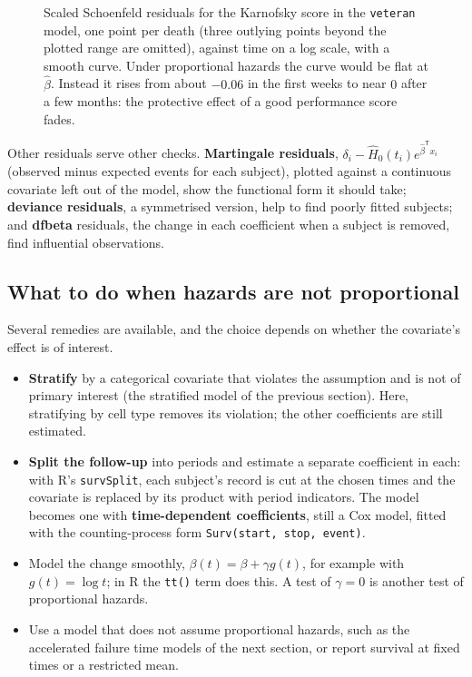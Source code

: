\documentclass[11pt,a4paper]{article}
\numberwithin{equation}{section}
\theoremstyle{definition}
\begin{document}
\begin{figure}[H]
\caption{Scaled Schoenfeld residuals for the Karnofsky score in the \texttt{veteran} model, one point per death (three outlying points beyond the plotted range are omitted), against time on a log scale, with a smooth curve. Under proportional hazards the curve would be flat at $\hat\beta$. Instead it rises from about $-0.06$ in the first weeks to near $0$ after
a few months: the protective effect of a good performance score fades.}
\label{fig:schoenfeld}
\end{figure}

Other residuals serve other checks. \textbf{Martingale residuals}, $\delta_i - \hat H_0(t_i)e^{\hat\beta^{\mathsf T}x_i}$ (observed minus expected events for each subject), plotted against a continuous covariate left out of the model, show the functional form it should take; \textbf{deviance residuals}, a symmetrised version, help to find poorly fitted subjects; and
\textbf{dfbeta} residuals, the change in each coefficient when a subject is removed, find influential observations.

\subsection{What to do when hazards are not proportional}
\label{ssec:phremedies}

Several remedies are available, and the choice depends on whether the covariate's effect is of interest.
\begin{itemize}
\item \textbf{Stratify} by a categorical covariate that violates the assumption and is not of primary interest (the stratified model of the previous section). Here, stratifying by cell type removes its violation; the other coefficients are still estimated.
\item \textbf{Split the follow-up} into periods and estimate a separate coefficient in each: with R's \texttt{survSplit}, each subject's record is cut at the chosen times and the covariate is replaced by its product with period indicators. The model becomes one with \textbf{time-dependent coefficients}, still a Cox model, fitted with the counting-process form
\texttt{Surv(start, stop, event)}.
\item Model the change smoothly, $\beta(t) = \beta + \gamma g(t)$, for example with $g(t) = \log t$; in R the \texttt{tt()} term does this. A test of $\gamma = 0$ is another test of proportional hazards.
\item Use a model that does not assume proportional hazards, such as the accelerated failure time models of the next section, or report survival at fixed times or a restricted mean.
\end{itemize}
\end{document}

